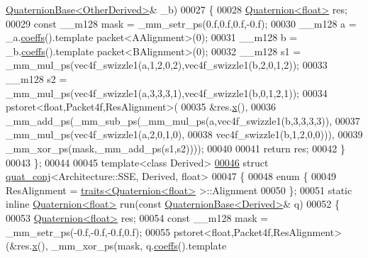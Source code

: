 \begin{DoxyCode}
      \hyperlink{group___geometry___module_class_eigen_1_1_quaternion_base}{QuaternionBase<OtherDerived>}& \_b)
00027   \{
00028     \hyperlink{group___geometry___module_class_eigen_1_1_quaternion}{Quaternion<float>} res;
00029     \textcolor{keyword}{const} \_\_m128 mask = \_mm\_setr\_ps(0.f,0.f,0.f,-0.f);
00030     \_\_m128 a = \_a.\hyperlink{group___geometry___module_aa7bb3fc337ffa82b0ad795783eb8a2ce}{coeffs}().template packet<AAlignment>(0);
00031     \_\_m128 b = \_b.\hyperlink{group___geometry___module_aa7bb3fc337ffa82b0ad795783eb8a2ce}{coeffs}().template packet<BAlignment>(0);
00032     \_\_m128 s1 = \_mm\_mul\_ps(vec4f\_swizzle1(a,1,2,0,2),vec4f\_swizzle1(b,2,0,1,2));
00033     \_\_m128 s2 = \_mm\_mul\_ps(vec4f\_swizzle1(a,3,3,3,1),vec4f\_swizzle1(b,0,1,2,1));
00034     pstoret<float,Packet4f,ResAlignment>(
00035               &res.\hyperlink{group___geometry___module_a782b9d83caa9bbe84d6e0b822f2dbea9}{x}(),
00036               \_mm\_add\_ps(\_mm\_sub\_ps(\_mm\_mul\_ps(a,vec4f\_swizzle1(b,3,3,3,3)),
00037                                     \_mm\_mul\_ps(vec4f\_swizzle1(a,2,0,1,0),
00038                                                vec4f\_swizzle1(b,1,2,0,0))),
00039                          \_mm\_xor\_ps(mask,\_mm\_add\_ps(s1,s2))));
00040     
00041     \textcolor{keywordflow}{return} res;
00042   \}
00043 \};
00044 
00045 \textcolor{keyword}{template}<\textcolor{keyword}{class} Derived>
\hyperlink{struct_eigen_1_1internal_1_1quat__conj_3_01_architecture_1_1_s_s_e_00_01_derived_00_01float_01_4}{00046} \textcolor{keyword}{struct }\hyperlink{struct_eigen_1_1internal_1_1quat__conj}{quat\_conj}<Architecture::SSE, Derived, float>
00047 \{
00048   \textcolor{keyword}{enum} \{
00049     ResAlignment = \hyperlink{struct_eigen_1_1internal_1_1traits}{traits<Quaternion<float>} >::Alignment
00050   \};
00051   \textcolor{keyword}{static} \textcolor{keyword}{inline} \hyperlink{group___geometry___module_class_eigen_1_1_quaternion}{Quaternion<float>} run(\textcolor{keyword}{const} 
      \hyperlink{group___geometry___module_class_eigen_1_1_quaternion_base}{QuaternionBase<Derived>}& q)
00052   \{
00053     \hyperlink{group___geometry___module_class_eigen_1_1_quaternion}{Quaternion<float>} res;
00054     \textcolor{keyword}{const} \_\_m128 mask = \_mm\_setr\_ps(-0.f,-0.f,-0.f,0.f);
00055     pstoret<float,Packet4f,ResAlignment>(&res.\hyperlink{group___geometry___module_a782b9d83caa9bbe84d6e0b822f2dbea9}{x}(), \_mm\_xor\_ps(mask, q.\hyperlink{group___geometry___module_aa7bb3fc337ffa82b0ad795783eb8a2ce}{coeffs}().template 

\end{DoxyCode}
